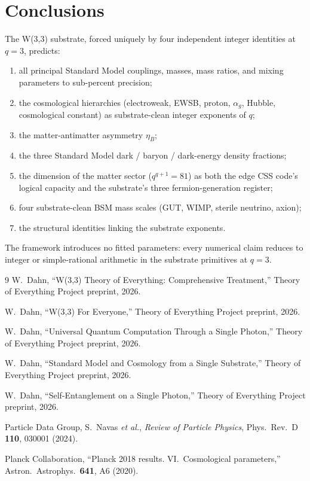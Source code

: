 \documentclass[11pt]{article}
\begin{document}
\section{Conclusions}

The W(3,3) substrate, forced uniquely by four independent integer
identities at $q = 3$, predicts:
\begin{enumerate}[noitemsep]
  \item all principal Standard Model couplings, masses, mass ratios,
    and mixing parameters to sub-percent precision;
  \item the cosmological hierarchies (electroweak, EWSB, proton, $\alpha_g$,
    Hubble, cosmological constant) as substrate-clean integer
    exponents of $q$;
  \item the matter-antimatter asymmetry $\eta_B$;
  \item the three Standard Model dark / baryon / dark-energy density
    fractions;
  \item the dimension of the matter sector ($q^{q+1} = 81$) as both the
    edge CSS code's logical capacity and the substrate's three
    fermion-generation register;
  \item four substrate-clean BSM mass scales (GUT, WIMP, sterile neutrino,
    axion);
  \item the structural identities linking the substrate exponents.
\end{enumerate}

The framework introduces no fitted parameters: every numerical claim
reduces to integer or simple-rational arithmetic in the substrate
primitives at $q = 3$.

\begin{thebibliography}{9}
  W.~Dahn, ``W(3,3) Theory of Everything: Comprehensive Treatment,''
  Theory of Everything Project preprint, 2026.

  W.~Dahn, ``W(3,3) For Everyone,''
  Theory of Everything Project preprint, 2026.

  W.~Dahn, ``Universal Quantum Computation Through a Single Photon,''
  Theory of Everything Project preprint, 2026.

  W.~Dahn, ``Standard Model and Cosmology from a Single Substrate,''
  Theory of Everything Project preprint, 2026.

  W.~Dahn, ``Self-Entanglement on a Single Photon,''
  Theory of Everything Project preprint, 2026.

  Particle Data Group, S.~Navas \emph{et al.},
  \emph{Review of Particle Physics},
  Phys.\ Rev.\ D \textbf{110}, 030001 (2024).

  Planck Collaboration, ``Planck 2018 results. VI.~Cosmological parameters,''
  Astron.\ Astrophys.\ \textbf{641}, A6 (2020).
\end{thebibliography}
\end{document}
